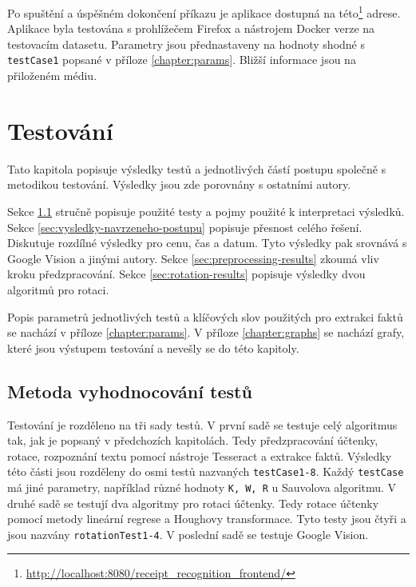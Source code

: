 \documentclass[thesis=B,czech]{FITthesis}[2019/12/23]
\def\myit#1{\texttt{#1}}
\begin{document}
Po spuštění a úspěšném dokončení příkazu je aplikace dostupná na této\footnote{\url{http://localhost:8080/receipt_recognition_frontend/}} adrese. Aplikace byla testována s prohlížečem Firefox \cite{firefox} a nástrojem Docker verze \cite{docker} na testovacím datasetu. Parametry jsou přednastaveny na hodnoty shodné s \myit{testCase1} popsané v příloze \ref{chapter:params}. Bližší informace jsou na přiloženém médiu.

\chapter{Testování}
\label{chapter:testovani}

Tato kapitola popisuje výsledky testů a jednotlivých částí postupu společně s metodikou testování. Výsledky jsou zde porovnány s ostatními autory.

Sekce \ref{sec:metoda-vyhodnocovani-testu} stručně popisuje použité testy a pojmy použité k interpretaci výsledků. Sekce \ref{sec:vysledky-navrzeneho-postupu} popisuje přesnost celého řešení. Diskutuje rozdílné výsledky pro cenu, čas a datum. Tyto výsledky pak srovnává s Google Vision a jinými autory. Sekce \ref{sec:preprocessing-results} zkoumá vliv kroku předzpracování. Sekce \ref{sec:rotation-results} popisuje výsledky dvou algoritmů pro rotaci.

Popis parametrů jednotlivých testů a klíčových slov použitých pro extrakci faktů se nachází v příloze \ref{chapter:params}. V příloze \ref{chapter:graphs} se nachází grafy, které jsou výstupem testování a nevešly se do této kapitoly.

\section{Metoda vyhodnocování testů}
\label{sec:metoda-vyhodnocovani-testu}

Testování je rozděleno na tři sady testů. V první sadě se testuje celý algoritmus tak, jak je popsaný v předchozích kapitolách. Tedy předzpracování účtenky, rotace, rozpoznání textu pomocí nástroje Tesseract a extrakce faktů. Výsledky této části jsou rozděleny do osmi testů nazvaných \myit{testCase1-8}. Každý \myit{testCase} má jiné parametry, například různé hodnoty \myit{K, W, R} u Sauvolova algoritmu. V druhé sadě se testují dva algoritmy pro rotaci účtenky. Tedy rotace účtenky pomocí metody lineární regrese a Houghovy transformace. Tyto testy jsou čtyři a jsou nazvány \myit{rotationTest1-4}. V poslední sadě se testuje Google Vision.
\end{document}
